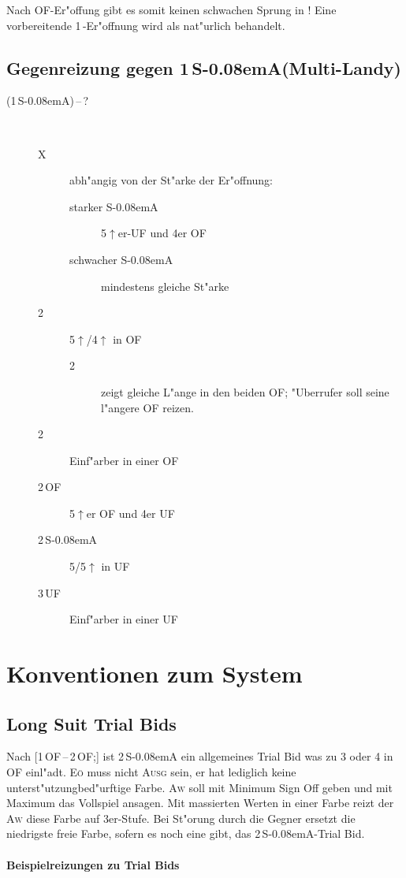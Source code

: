\documentclass[11pt,german,twocolumn]{scrartcl}
\def\kar{\nobreak\,\Di\xspace}
\def\tre{\nobreak\,\Cl\xspace}
\def\tr{\Cl\xspace}
\def\pl{$\uparrow$\xspace}
\def\uf{\nobreak\textsf{\,UF}\xspace}
\def\of{\nobreak\textsf{\,OF}\xspace}
\def\ufa{\nobreak\textsf{UF}\xspace}
\def\ofa{\nobreak\textsf{OF}\xspace}
\def\sa{\nobreak\textsf{S\kern-0.08emA}\xspace}
\def\SA{\nobreak\,\sa}
\def\kontra{\textsf{X}\xspace}
\def\sep{\,--\,}
\def\bal{\textsc{Ausg}\xspace}
\def\aw{\textsc{Aw}\xspace}
\def\eo{\textsc{E\"o}\xspace}
\def\bdsc{\begin{description}}
\def\edsc{\end{description}}
\newcommand{\Index}[1]{#1\index{#1}}
\begin{document}
Nach \ofa-Er"offung gibt es somit keinen schwachen Sprung in \tr! Eine
vorbereitende 1\tre-Er"offnung wird als nat"urlich behandelt.

\subsection{Gegenreizung gegen 1\SA (\Index{Multi-Landy})}

\bdsc
\item[(1\SA){}\sep?] ~
 \bdsc
 \item[\kontra] abh"angig von der St"arke der Er"offnung:
   \bdsc 
     \item[starker \sa] 5\pl{}er-\ufa und 4er \ofa
     \item[schwacher \sa] mindestens gleiche St"arke
   \edsc
 \item[2\tre] 5\pl/4\pl in \ofa
  \bdsc
  \item[2\kar] zeigt gleiche L"ange in den beiden \ofa; "Uberrufer soll
    seine l"angere \ofa reizen.
  \edsc
 \item[2\kar] Einf"arber in einer \ofa
 \item[2\of] 5\pl{}er \ofa und 4er \ufa
 \item[2\SA] 5/5\pl in \ufa
 \item[3\uf] Einf"arber in einer \ufa
 \edsc
\edsc

\newpage
\section{Konventionen zum System}

\subsection{Long Suit Trial Bids}

Nach [1\of{}\sep2\of;] ist 2\SA ein allgemeines Trial Bid was zu 3 oder 4 in
\ofa einl"adt. \eo muss nicht \bal sein, er hat lediglich keine
unterst"utzungbed"urftige Farbe. \aw soll mit Minimum Sign Off geben und mit
Maximum das Vollspiel ansagen. Mit massierten Werten in einer Farbe reizt der
\aw diese Farbe auf 3er-Stufe. Bei St"orung durch die Gegner ersetzt die
niedrigste freie Farbe, sofern es noch eine gibt, das 2\SA-Trial Bid.

\paragraph{Beispielreizungen zu Trial Bids} ~
\end{document}
